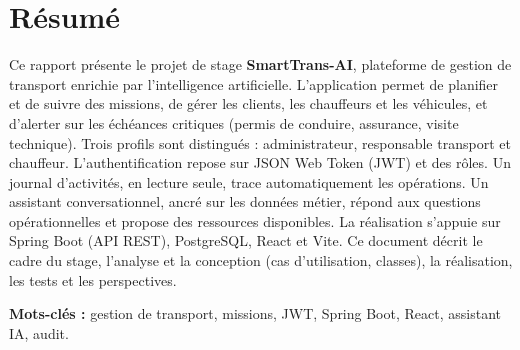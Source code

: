 \chapter*{Résumé}

Ce rapport présente le projet de stage \textbf{SmartTrans-AI}, plateforme de gestion de transport enrichie par l'intelligence artificielle. L'application permet de planifier et de suivre des missions, de gérer les clients, les chauffeurs et les véhicules, et d'alerter sur les échéances critiques (permis de conduire, assurance, visite technique). Trois profils sont distingués : administrateur, responsable transport et chauffeur. L'authentification repose sur JSON Web Token (JWT) et des rôles. Un journal d'activités, en lecture seule, trace automatiquement les opérations. Un assistant conversationnel, ancré sur les données métier, répond aux questions opérationnelles et propose des ressources disponibles. La réalisation s'appuie sur Spring Boot (API REST), PostgreSQL, React et Vite. Ce document décrit le cadre du stage, l'analyse et la conception (cas d'utilisation, classes), la réalisation, les tests et les perspectives.

\vspace{0.8em}
\noindent\textbf{Mots-clés :} gestion de transport, missions, JWT, Spring Boot, React, assistant IA, audit.
